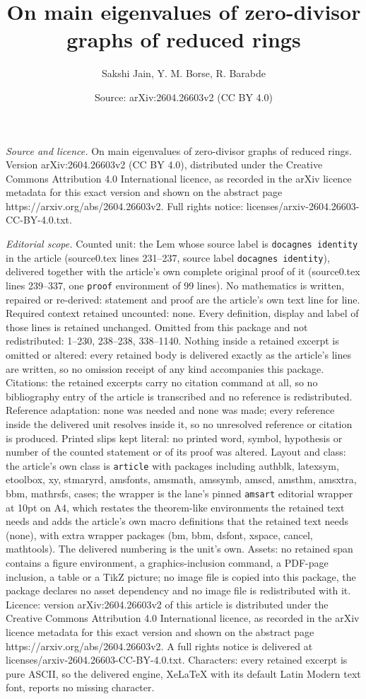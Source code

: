 \documentclass[10pt,a4paper]{amsart}
\title[On main eigenvalues of zero-divisor graphs of reduced rings]{On main eigenvalues of zero-divisor graphs of reduced rings}
\author{Sakshi Jain, Y. M. Borse, R. Barabde}
\date{Source: arXiv:2604.26603v2 (CC BY 4.0)}
\begin{document}
\maketitle

\noindent\emph{Source and licence.} On main eigenvalues of zero-divisor graphs of reduced rings. Version arXiv:2604.26603v2 (CC BY 4.0), distributed under the Creative Commons Attribution 4.0 International licence, as recorded in the arXiv licence metadata for this exact version and shown on the abstract page https://arxiv.org/abs/2604.26603v2. Full rights notice: licenses/arxiv-2604.26603-CC-BY-4.0.txt.\par\smallskip

\noindent\textit{Editorial scope.} Counted unit: the Lem whose source label is \texttt{docagnes identity} in the article (source0.tex lines 231--237, source label \texttt{docagnes identity}), delivered together with the article's own complete original proof of it (source0.tex lines 239--337, one \texttt{proof} environment of 99 lines). No mathematics is written, repaired or re-derived: statement and proof are the article's own text line for line. Required context retained uncounted: none. Every definition, display and label of those lines is retained unchanged. Omitted from this package and not redistributed: 1--230, 238--238, 338--1140. Nothing inside a retained excerpt is omitted or altered: every retained body is delivered exactly as the article's lines are written, so no omission receipt of any kind accompanies this package. Citations: the retained excerpts carry no citation command at all, so no bibliography entry of the article is transcribed and no reference is redistributed. Reference adaptation: none was needed and none was made; every reference inside the delivered unit resolves inside it, so no unresolved reference or citation is produced. Printed slips kept literal: no printed word, symbol, hypothesis or number of the counted statement or of its proof was altered. Layout and class: the article's own class is \texttt{article} with packages including authblk, latexsym, etoolbox, xy, stmaryrd, amsfonts, amsmath, amssymb, amscd, amsthm, amsxtra, bbm, mathrsfs, cases; the wrapper is the lane's pinned \texttt{amsart} editorial wrapper at 10pt on A4, which restates the theorem-like environments the retained text needs and adds the article's own macro definitions that the retained text needs (none), with extra wrapper packages (bm, bbm, dsfont, xspace, cancel, mathtools). The delivered numbering is the unit's own. Assets: no retained span contains a figure environment, a graphics-inclusion command, a PDF-page inclusion, a table or a TikZ picture; no image file is copied into this package, the package declares no asset dependency and no image file is redistributed with it. Licence: version arXiv:2604.26603v2 of this article is distributed under the Creative Commons Attribution 4.0 International licence, as recorded in the arXiv licence metadata for this exact version and shown on the abstract page https://arxiv.org/abs/2604.26603v2. A full rights notice is delivered at licenses/arxiv-2604.26603-CC-BY-4.0.txt. Characters: every retained excerpt is pure ASCII, so the delivered engine, XeLaTeX with its default Latin Modern text font, reports no missing character.
\end{document}
